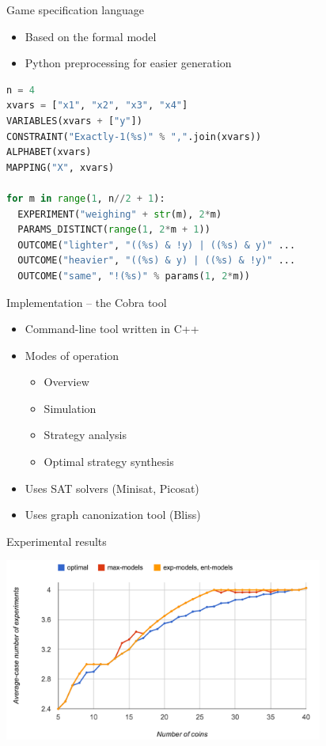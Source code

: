 \documentclass{beamer}
\begin{document}
\begin{frame}[fragile]{Game specification language}
\begin{itemize}
\item Based on the formal model
\item Python preprocessing for easier generation
\end{itemize}

\pause
\begin{lstlisting}[language=Python]
n = 4
xvars = ["x1", "x2", "x3", "x4"]
VARIABLES(xvars + ["y"])
CONSTRAINT("Exactly-1(%s)" % ",".join(xvars))
ALPHABET(xvars)
MAPPING("X", xvars)

for m in range(1, n//2 + 1):
  EXPERIMENT("weighing" + str(m), 2*m)
  PARAMS_DISTINCT(range(1, 2*m + 1))
  OUTCOME("lighter", "((%s) & !y) | ((%s) & y)" ...
  OUTCOME("heavier", "((%s) & y) | ((%s) & !y)" ...
  OUTCOME("same", "!(%s)" % params(1, 2*m))
\end{lstlisting}
\end{frame}

\begin{frame}{Implementation -- the Cobra tool}
\begin{itemize} \itemsep 10pt
\item Command-line tool written in C++
\item Modes of operation
  \begin{itemize}
  \item Overview
  \item Simulation
  \item Strategy analysis
  \item Optimal strategy synthesis
  \end{itemize}
\item Uses SAT solvers (Minisat, Picosat)
\item Uses graph canonization tool (Bliss)
\end{itemize}
\end{frame}

\begin{frame}{Experimental results}
\centerline{\includegraphics[height=6cm]{graph.png}}
\end{frame}
\end{document}
